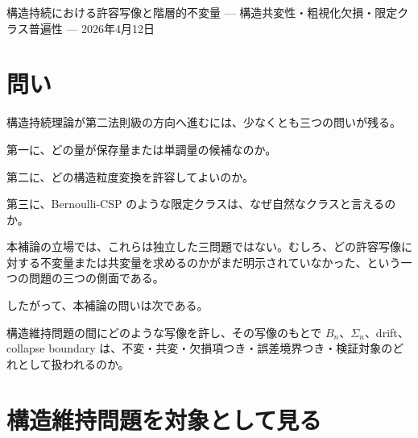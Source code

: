 \documentclass[12pt,a4paper]{article}
\begin{document}
\PaperTitleBlock
  {構造持続における許容写像と階層的不変量}
  {— 構造共変性・粗視化欠損・限定クラス普遍性 —}
  {2026年4月12日}

\begin{abstract}
本補論は、構造持続理論における「保存される量」「許容される構造粒度変換」「自然なドメインクラス」の関係を整理する。目的は、構造持続理論を直ちに単一の普遍法則として宣言することではない。むしろ、どの写像のもとで何が不変であり、どの写像のもとで何が共変し、どの写像では欠損項や誤差境界を持ち、どの写像では観測・推定指標による凍結検証に降りるべきかを明確にすることである。

中心となる見方は、構造維持問題を対象とし、その間の写像を許容写像として扱うことである。名前変更や測度保存同型では累積純消耗量 \(B_{n}\) は不変である。測度比を正の冪で読み替えるようなゲージ変更では \(B_{n}\) は正の定数倍として共変する。粗視化や観測指標による推定では一般に不変性は失われるため、許容条件、誤差境界、または凍結後の予測力検証が必要になる。

この整理により、仕様固定構造層、条件付き構造埋め込み層、構造推定層は、強弱の直線的序列ではなく、観測可能性と許容写像の違いとして読める。Bernoulli-CSP class も、SAT 風の構文を後から集めたものではなく、iid bad-event exposure と log-drift を保つテンプレート保存写像で閉じた仕様固定構造層の限定クラスとして位置づけられる。
\end{abstract}

\section{問い}\label{ux554fux3044}

構造持続理論が第二法則級の方向へ進むには、少なくとも三つの問いが残る。

第一に、どの量が保存量または単調量の候補なのか。

第二に、どの構造粒度変換を許容してよいのか。

第三に、Bernoulli-CSP のような限定クラスは、なぜ自然なクラスと言えるのか。

本補論の立場では、これらは独立した三問題ではない。むしろ、どの許容写像に対する不変量または共変量を求めるのかがまだ明示されていなかった、という一つの問題の三つの側面である。

したがって、本補論の問いは次である。

構造維持問題の間にどのような写像を許し、その写像のもとで \(B_{n}\)、\(\Sigma_{n}\)、drift、collapse boundary は、不変・共変・欠損項つき・誤差境界つき・検証対象のどれとして扱われるのか。

\section{構造維持問題を対象として見る}\label{ux69cbux9020ux7dadux6301ux554fux984cux3092ux5bfeux8c61ux3068ux3057ux3066ux898bux308b}
\end{document}
